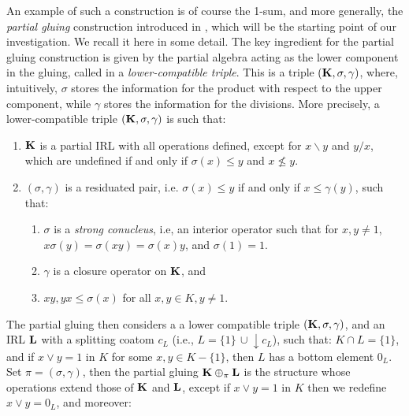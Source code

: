 \documentclass{amsart}
\theoremstyle{definition}
\numberwithin{equation}{section}
\newcommand{\alg}[1]{{\textbf{\upshape #1}}}  %
\newcommand{\back}{\backslash}
\begin{document}
An example of such a construction is of course the 1-sum, and more generally, the {\em partial gluing} construction introduced in \cite{GalatosUgolini}, which will be the starting point of our investigation. We recall it here in some detail. 
 The key ingredient for the partial gluing construction is given by the partial algebra acting as the lower component in the gluing, called in \cite{GalatosUgolini} a
  \emph{lower-compatible triple}. This is a triple $(\alg K, \sigma, \gamma)$, where, intuitively, $\sigma$ stores the information for the product with respect to the upper component, while $\gamma$ stores the information for the divisions. More precisely, a lower-compatible triple $(\alg K, \sigma, \gamma)$ is such that:
 \begin{enumerate}
\item  $\alg K$ is a partial IRL with all operations defined, except for $x \back y$ and $y /x$, which are undefined if and only if $\sigma(x) \leq y$ and $x \not\leq y$.\item\label{property2UPT}  $(\sigma, \gamma)$  is a residuated pair, i.e. $\sigma(x) \leq y$ if and only if $x \leq \gamma(y)$, such that:\begin{enumerate}
\item $\sigma$ is a \emph{strong conucleus}, i.e, an interior operator such that for $x, y \neq 1$, $x \sigma(y) = \sigma(xy) = \sigma(x) y$, and $\sigma(1) = 1$.
\item $\gamma$ is a closure operator on $\alg K$, and
\item $x y, y  x \leq \sigma(x)$ for all $x, y \in K, y \neq 1$.
\end{enumerate}
\end{enumerate}
The partial gluing then considers a a lower compatible triple $(\alg K, \sigma, \gamma)$, and an IRL $\alg L$ with a splitting coatom $c_L$ (i.e., $L=\{1\} \,\cup\! \downarrow\! c_L$), such that: $K \cap L = \{1\}$, and if $x \lor y = 1$ in $K$ for some $x,y \in K-\{1\}$, then $L$ has a bottom element $0_{L}$.
Set $\pi = (\sigma, \gamma)$, then the partial gluing $\alg K \oplus_{\pi}  \alg L$ is the structure whose operations extend those of $\alg K$ and $\alg L$, except if $x \lor y = 1$ in $K$ then we redefine $x \lor y = 0_{L}$, and moreover:
\end{document}
